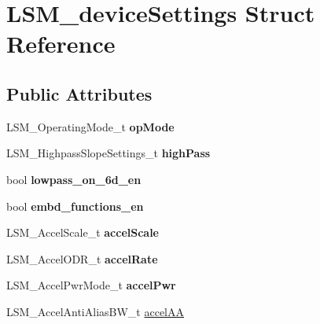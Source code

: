 \hypertarget{structLSM__deviceSettings}{}\section{L\+S\+M\+\_\+device\+Settings Struct Reference}
\label{structLSM__deviceSettings}
\subsection*{Public Attributes}
\begin{DoxyCompactItemize}
\item 
\mbox{\label{structLSM__deviceSettings_a31cb0f95054f6298e16f3a58e452e489}} 
L\+S\+M\+\_\+\+Operating\+Mode\+\_\+t {\bfseries op\+Mode}
\item 
\mbox{\label{structLSM__deviceSettings_ae2fbd1ba0dd7778e214f4c869ea05fd0}} 
L\+S\+M\+\_\+\+Highpass\+Slope\+Settings\+\_\+t {\bfseries high\+Pass}
\item 
\mbox{\label{structLSM__deviceSettings_a4b02e8557e593c1ed00c6a4645d996ad}} 
bool {\bfseries lowpass\+\_\+on\+\_\+6d\+\_\+en}
\item 
\mbox{\label{structLSM__deviceSettings_ae7c3b8a96cf9e9af8e99168a1bd69a35}} 
bool {\bfseries embd\+\_\+functions\+\_\+en}
\item 
\mbox{\label{structLSM__deviceSettings_a66a08d610b1f376fbb9876a38c47a550}} 
L\+S\+M\+\_\+\+Accel\+Scale\+\_\+t {\bfseries accel\+Scale}
\item 
\mbox{\label{structLSM__deviceSettings_a59afab5153af1c1a8ea8b668d2dee1ef}} 
L\+S\+M\+\_\+\+Accel\+O\+D\+R\+\_\+t {\bfseries accel\+Rate}
\item 
\mbox{\label{structLSM__deviceSettings_a92232b1ed3e11b4440a15a9846436384}} 
L\+S\+M\+\_\+\+Accel\+Pwr\+Mode\+\_\+t {\bfseries accel\+Pwr}
\item 
L\+S\+M\+\_\+\+Accel\+Anti\+Alias\+B\+W\+\_\+t \hyperlink{structLSM__deviceSettings_ae9bfe4e1b72fde4f37df849563092908}{accel\+AA}
\item 

\end{DoxyCompactItemize}
